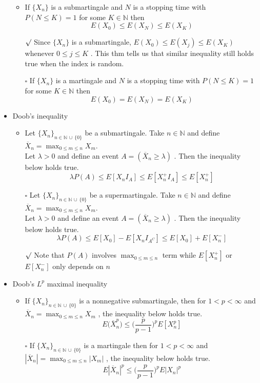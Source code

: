 \documentclass[12pt, A4]{article}
\newcommand{\sq}{$\square$}
\newcommand{\rmk}{$\surd$}
\newcommand{\N}{\mathbb{N}}
\newcommand{\union}{\,\cup\,}
\begin{document}
\begin{itemize}
	\begin{itemize}
		\item If $\{X_n\}$ is a submartingale and $N$ is a stopping time with $P(N\leq K)=1$ for some $K\in \N$ then $$E(X_0)\leq E(X_N)\leq E(X_K) $$
		\item[\rmk] Since $\{X_n\}$ is a submartingale, $E(X_0)\leq E(X_j)\leq E(X_K)$ whenever $0\leq j\leq K$ . This thm tells us that similar inequality still holds true when the index is random. 
		\item[\sq] If $\{X_n\}$ is a martingale and $N$ is a stopping time with $P(N\leq K)=1$ for some $K\in \N$ then $$E(X_0)= E(X_N)= E(X_K) $$
	\end{itemize}
	\item Doob's inequality
	\begin{itemize}
		\item Let $\{X_n\}_{n\in \N\union \{0\} }$ be a submartingale. Take $n\in \N$ and define $\overline{X}_n=\max_{0\leq m \leq n}X_m$. \\ Let $\lambda>0$ and define an event $A=(\overline{X}_n\geq \lambda)$ . Then the inequality below holds true.
		$$
			\lambda P(A)\leq E[X_nI_A]\leq E[X_n^+ I_A]\leq E[X_n^+]
		$$
		\item[\sq] Let $\{X_n\}_{n\in \N\union \{0\} }$ be a supermartingale. Take $n\in \N$ and define $\overline{X}_n=\max_{0\leq m \leq n}X_m$. \\ Let $\lambda>0$ and define an event $A=(\overline{X}_n\geq \lambda)$ . Then the inequality below holds true.
		$$
			\lambda P(A)\leq E[X_0]-E[X_n I_{A^C}]\leq E[X_0]+E[X_n^-]
		$$ 
		\item[\rmk] Note that $P(A)$ involves $\max_{0\leq m \leq n}$ term while $E[X_n^+]$ or $E[X_n^-]$ only depends on $n$
	\end{itemize}
	\item Doob's $L^p$ maximal inequality
	\begin{itemize}
		\item If $\{X_n\}_{n\in \N\union \{0\} }$ is a nonnegative submartingale, then for $1<p<\infty$ and \\ $\overline{X}_n=\max_{0\leq m \leq n}X_m$ , the inequality below holds true. 
		$$
		E\big(\overline{X}_n^p\big)\leq \Big(\frac{p}{p-1}\Big)^p E[X_n^p]
		$$
		\item[\sq] If $\{X_n\}_{n\in \N\union \{0\}}$ is a martingale then for $1<p<\infty$ and 
		\\$|\overline{X}_n|=\max_{0\leq m\leq n}|X_m|$ , the inequality below holds true.
		$$
		E|\overline{X}_n|^p\leq \Big(\frac{p}{p-1}\Big)^p E|X_n|^p
$$
\end{itemize}
\end{itemize}
\end{document}
